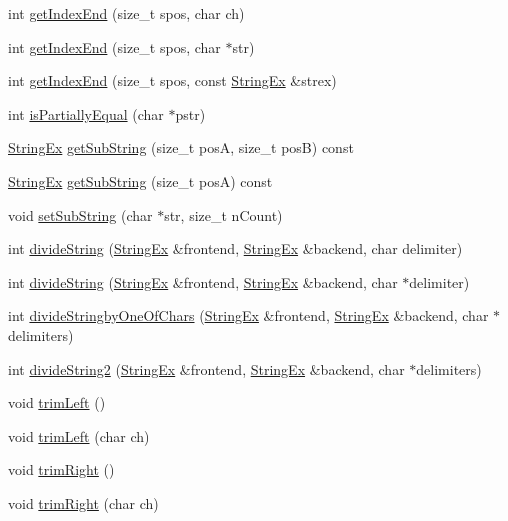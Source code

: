 \begin{CompactItemize}
int \hyperlink{classStringEx_ab5c039e3571fd9d5d230ccd5e78c5bd}{getIndexEnd} (size\_\-t spos, char ch)
\item 
int \hyperlink{classStringEx_655d87c51488bec7cf2077301bfcab02}{getIndexEnd} (size\_\-t spos, char $\ast$str)
\item 
int \hyperlink{classStringEx_82f845f34f93c0976c65128787a13251}{getIndexEnd} (size\_\-t spos, const \hyperlink{classStringEx}{StringEx} \&strex)
\item 
int \hyperlink{classStringEx_abbdf798181433adcf54a4924e4ae566}{isPartiallyEqual} (char $\ast$pstr)
\item 
\hyperlink{classStringEx}{StringEx} \hyperlink{classStringEx_bd2c36be4fbacd796cd43ecc5ea0de57}{getSubString} (size\_\-t posA, size\_\-t posB) const 
\item 
\hyperlink{classStringEx}{StringEx} \hyperlink{classStringEx_8f2103c0eb6908f4d17e7aa5f8501887}{getSubString} (size\_\-t posA) const 
\item 
void \hyperlink{classStringEx_d9f3f0708b320587c5b7ec9ec473855e}{setSubString} (char $\ast$str, size\_\-t nCount)
\item 
int \hyperlink{classStringEx_104a561876d7b585b981951e99696874}{divideString} (\hyperlink{classStringEx}{StringEx} \&frontend, \hyperlink{classStringEx}{StringEx} \&backend, char delimiter)
\item 
int \hyperlink{classStringEx_22095ec14f3644b9ff326921bc7b65a1}{divideString} (\hyperlink{classStringEx}{StringEx} \&frontend, \hyperlink{classStringEx}{StringEx} \&backend, char $\ast$delimiter)
\item 
int \hyperlink{classStringEx_fbb3e74263c90c4d608923377c306b4a}{divideStringbyOneOfChars} (\hyperlink{classStringEx}{StringEx} \&frontend, \hyperlink{classStringEx}{StringEx} \&backend, char $\ast$delimiters)
\item 
int \hyperlink{classStringEx_bc9bd1b51ebefa56475a3d33ddca7550}{divideString2} (\hyperlink{classStringEx}{StringEx} \&frontend, \hyperlink{classStringEx}{StringEx} \&backend, char $\ast$delimiters)
\item 
void \hyperlink{classStringEx_a9416c29e6eaaa05c8831d4320019717}{trimLeft} ()
\item 
void \hyperlink{classStringEx_d5e480621a65dcbf6d5bee88a9c66509}{trimLeft} (char ch)
\item 
void \hyperlink{classStringEx_ca9136e18b9f519ab85b04181d11ddd3}{trimRight} ()
\item 
void \hyperlink{classStringEx_5bec13a31e3517290de6b15e2f9fe336}{trimRight} (char ch)

\end{CompactItemize}
